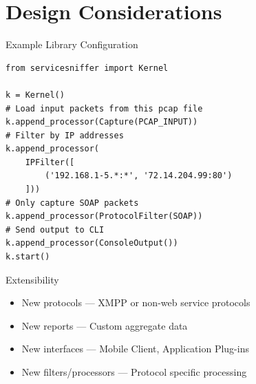 \documentclass{beamer}
\begin{document}
\section{Design Considerations}

\begin{frame}[fragile]{Example Library Configuration}
    \begin{lstlisting}
from servicesniffer import Kernel

k = Kernel()
# Load input packets from this pcap file
k.append_processor(Capture(PCAP_INPUT))
# Filter by IP addresses
k.append_processor(
    IPFilter([
        ('192.168.1-5.*:*', '72.14.204.99:80')
    ]))
# Only capture SOAP packets
k.append_processor(ProtocolFilter(SOAP))
# Send output to CLI
k.append_processor(ConsoleOutput())
k.start()
    \end{lstlisting}
\end{frame}


\begin{frame}{Extensibility}
    \begin{itemize}
        \item New protocols --- XMPP or non-web service protocols
        \item New reports --- Custom aggregate data
        \item New interfaces --- Mobile Client, Application Plug-ins
        \item New filters/processors --- Protocol specific processing
    \end{itemize}
\end{frame}

\end{document}
